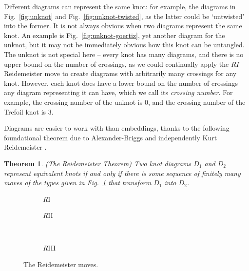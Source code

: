 \documentclass[12pt]{report}
\newtheorem*{theorem}{Theorem}
\begin{document}
Different diagrams can represent the same knot: for example, the diagrams in Fig.~\ref{fig:unknot} and Fig.~\ref{fig:unknot-twisted}, as the latter could be `untwisted' into the former. It is not always obvious when two diagrams represent the same knot. An example is Fig.~\ref{fig:unknot-goertiz}, yet another diagram for the unknot, but it may not be immediately obvious how this knot can be untangled. The unknot is not special here -- every knot has many diagrams, and there is no upper bound on the number of crossings, as we could continually apply the $R\textit{I}$ Reidemeister move to create diagrams with arbitrarily many crossings for any knot. However, each knot does have a lower bound on the number of crossings any diagram representing it can have, which we call its \textit{crossing number}. For example, the crossing number of the unknot is $0$, and the crossing number of the Trefoil knot is $3$.

Diagrams are easier to work with than embeddings, thanks to the following foundational theorem due to Alexander-Briggs  \cite{types-of-knotted-curves} and independently Kurt Reidemeister \cite{elementary-justification-knot-theory}.
\begin{theorem}(The Reidemeister Theorem)
Two knot diagrams $D_{1}$ and $D_{2}$ represent equivalent knots if and only if there is some sequence of finitely many moves of the types given in Fig.~\ref{fig:reidemeister_moves} that transform $D_{1}$ into $D_{2}$.
\end{theorem}

\begin{figure}[hbt!]
	\centering
	\hspace*{\fill}
	\begin{subfigure}[b]{0.35 \textwidth}
		\centering
		\def\svgscale{0.22}
		
		\caption{\textit{R}I}
	\end{subfigure}
	\hspace*{\fill}
	\begin{subfigure}[b]{0.35 \textwidth}
		\centering
		\def\svgscale{0.22}
		
		\caption{\textit{R}II}
	\end{subfigure}
	\hspace*{\fill}
	\\
	\hspace*{\fill}
	\begin{subfigure}[b]{0.35 \textwidth}
		\centering
		\def\svgscale{0.22}
		
		\caption{\textit{R}III}
	\end{subfigure}
	\hspace*{\fill}
	\caption{The Reidemeister moves.}
	\label{fig:reidemeister_moves}
\end{figure}
\end{document}
